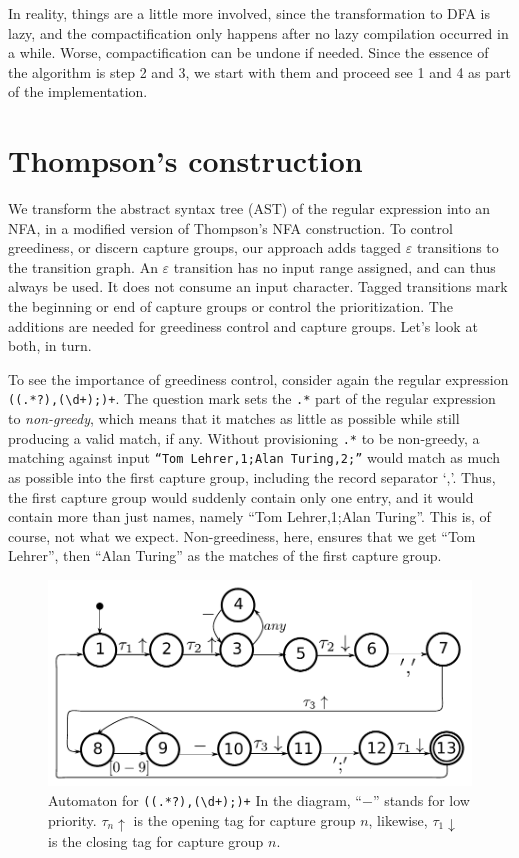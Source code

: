 \documentclass[11pt,a4paper,twoside,openright]{Thesis}
\theoremstyle{definition}
\newcommand{\seclabel}[1]{\label{sec:#1}}
\begin{document}
In reality, things are a little more involved, since the transformation
to DFA is lazy, and the compactification only happens after no lazy
compilation occurred in a while. Worse, compactification can be
undone if needed. Since the essence of the algorithm is step 2 and 3,
we start with them and proceed see 1 and 4 as part of the implementation.

\section{Thompson's construction} 	\seclabel{thompson}

We transform the abstract syntax tree (AST) of the regular expression into an NFA,
in a modified version of Thompson's NFA construction. To
control greediness, or discern capture groups, our approach adds tagged
$\varepsilon$ transitions to the transition graph. An
$\varepsilon$ transition has no input range assigned, and can thus always
be used. It does not consume an input character. Tagged transitions
mark the beginning or end of capture groups or control the prioritization.
The additions are needed for greediness control and capture groups.
Let's look at both, in turn.

To see the importance of greediness control, consider again the regular
expression \texttt{((.*?),(\textbackslash{}d+);)+}. The question
mark sets the \texttt{.*} part of the regular expression to
\emph{non-greedy}, which means that it matches as little as
possible while still producing a valid match, if any.  Without
provisioning \texttt{.*} to be non-greedy, a matching against input
\texttt{``Tom Lehrer,1;Alan Turing,2;''} would match as much as
possible into the first capture group, including the record separator
`,'.  Thus, the first capture group would suddenly contain only one
entry, and it would contain more than just names, namely ``Tom
Lehrer,1;Alan Turing''.  This is, of course, not what we expect.
Non-greediness, here, ensures that we get ``Tom Lehrer'', then
``Alan Turing'' as the matches of the first capture group.

\begin{figure}[htp]
\includegraphics[width=\linewidth]{graphs/lehrer_automaton}

\caption[NFA for \texttt{((.*?),(\textbackslash{}d+);)+}]{\label{fig:example-automaton}
Automaton for \texttt{((.*?),(\textbackslash{}d+);)+}
In the diagram, ``$-$'' stands for low priority. $\tau_n\uparrow$ is the
opening tag for capture group $n$, likewise, $\tau_1\downarrow$ is the closing
tag for capture group $n$.}
\end{figure}
\end{document}
